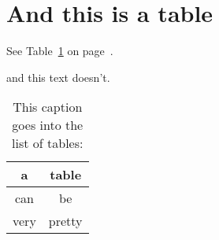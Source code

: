 \section{And this is a table}

See Table~\ref{tab:table_reference} on page~\pageref{tab:table_reference}.

\begin{table}[htb]
\figsp
\caption{This caption goes into the list of tables:}
and this text doesn't.

\begin{center}
\begin{tabular}{|c||c|}
\hline
a & table \\
\hline
can & be \\
\hline
very & pretty \\
\hline
\end{tabular}
\end{center}

\label{tab:table_reference}

\end{table}
